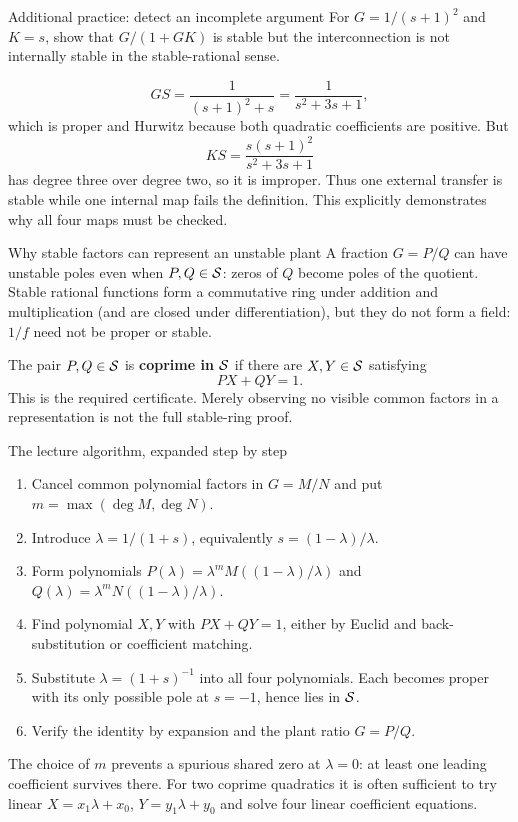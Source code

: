 \begin{question}{Additional practice: detect an incomplete argument}
For $G=1/(s+1)^2$ and $K=s$, show that $G/(1+GK)$ is stable but the interconnection is not internally stable in the stable-rational sense.
\end{question}
\begin{answer}
\[GS=\frac1{(s+1)^2+s}=\frac1{s^2+3s+1},\]
which is proper and Hurwitz because both quadratic coefficients are positive. But
\[KS=\frac{s(s+1)^2}{s^2+3s+1}\]
has degree three over degree two, so it is improper. Thus one external transfer is stable while one internal map fails the definition. This explicitly demonstrates why all four maps must be checked.
\end{answer}

\begin{concept}{Why stable factors can represent an unstable plant}
A fraction $G=P/Q$ can have unstable poles even when $P,Q\in\mathcal S$: zeros of $Q$ become poles of the quotient. Stable rational functions form a commutative ring under addition and multiplication (and are closed under differentiation), but they do not form a field: $1/f$ need not be proper or stable.

The pair $P,Q\in\mathcal S$ is \textbf{coprime in $\mathcal S$} if there are $X,Y\in\mathcal S$ satisfying
\[PX+QY=1.\]
This is the required certificate. Merely observing no visible common factors in a representation is not the full stable-ring proof.
\end{concept}
\begin{method}{The lecture algorithm, expanded step by step}
\begin{enumerate}
\item Cancel common polynomial factors in $G=M/N$ and put $m=\max(\deg M,\deg N)$.
\item Introduce $\lambda=1/(1+s)$, equivalently $s=(1-\lambda)/\lambda$.
\item Form polynomials $P(\lambda)=\lambda^mM((1-\lambda)/\lambda)$ and $Q(\lambda)=\lambda^mN((1-\lambda)/\lambda)$.
\item Find polynomial $X,Y$ with $PX+QY=1$, either by Euclid and back-substitution or coefficient matching.
\item Substitute $\lambda=(1+s)^{-1}$ into all four polynomials. Each becomes proper with its only possible pole at $s=-1$, hence lies in $\mathcal S$.
\item Verify the identity by expansion and the plant ratio $G=P/Q$.
\end{enumerate}
The choice of $m$ prevents a spurious shared zero at $\lambda=0$: at least one leading coefficient survives there. For two coprime quadratics it is often sufficient to try linear $X=x_1\lambda+x_0$, $Y=y_1\lambda+y_0$ and solve four linear coefficient equations.
\end{method}
